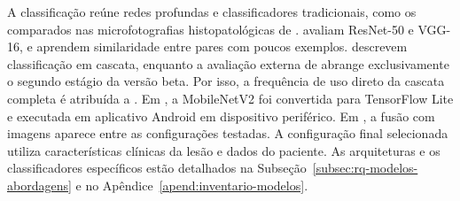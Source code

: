 A classificação reúne redes profundas e classificadores tradicionais, como os
comparados nas microfotografias histopatológicas de .
 avaliam ResNet-50 e VGG-16, e 
aprendem similaridade entre pares com poucos exemplos. 
descrevem classificação em cascata, enquanto a avaliação externa de
 abrange exclusivamente o segundo estágio da versão beta.
Por isso, a frequência de uso direto da cascata completa é atribuída a
.
Em , a MobileNetV2 foi convertida para
TensorFlow Lite e executada em aplicativo Android em dispositivo periférico.
Em , a fusão com imagens aparece entre as configurações
testadas. A configuração final selecionada utiliza características clínicas da
lesão e dados do paciente. As arquiteturas e os classificadores específicos estão
detalhados na Subseção~\ref{subsec:rq-modelos-abordagens} e no
Apêndice~\ref{apend:inventario-modelos}.

